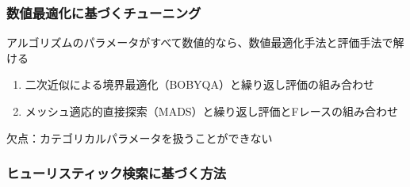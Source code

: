 \documentclass[twocolumn]{jarticle}     %
\begin{document}
\subsubsection{数値最適化に基づくチューニング}
アルゴリズムのパラメータがすべて数値的なら、数値最適化手法と評価手法で解ける

\begin{enumerate}
  \item 二次近似による境界最適化（BOBYQA）と繰り返し評価の組み合わせ
  \item メッシュ適応的直接探索（MADS）と繰り返し評価とFレースの組み合わせ
\end{enumerate}

欠点：カテゴリカルパラメータを扱うことができない

\subsubsection{ヒューリスティック検索に基づく方法}
\end{document}
